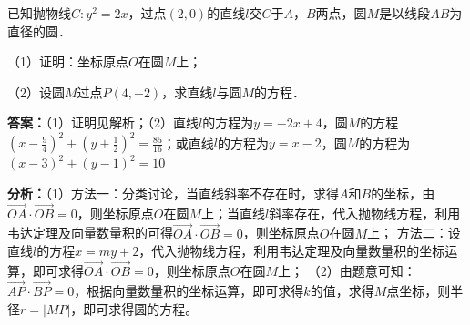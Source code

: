 \begin{question}[points=12]
已知抛物线$C:y^2=2x$，过点$(2,0)$的直线$l$交$C$于$A$，$B$两点，圆$M$是以线段$AB$为直径的圆．

（1）证明：坐标原点$O$在圆$M$上；

（2）设圆$M$过点$P(4,-2)$，求直线$l$与圆$M$的方程．
\begin{solution}
\textbf{答案：}（1）证明见解析；（2）直线$l$的方程为$y=-2x+4$，圆$M$的方程$(x-\frac{9}{4})^2+(y+\frac{1}{2})^2=\frac{85}{16}$；或直线$l$的方程为$y=x-2$，圆$M$的方程为$(x-3)^2+(y-1)^2=10$

\textbf{分析：}（1）方法一：分类讨论，当直线斜率不存在时，求得$A$和$B$的坐标，由$\overrightarrow{OA}\cdot\overrightarrow{OB}=0$，则坐标原点$O$在圆$M$上；当直线$l$斜率存在，代入抛物线方程，利用韦达定理及向量数量积的可得$\overrightarrow{OA}\cdot\overrightarrow{OB}=0$，则坐标原点$O$在圆$M$上；
方法二：设直线$l$的方程$x=my+2$，代入抛物线方程，利用韦达定理及向量数量积的坐标运算，即可求得$\overrightarrow{OA}\cdot\overrightarrow{OB}=0$，则坐标原点$O$在圆$M$上；
（2）由题意可知：$\overrightarrow{AP}\cdot\overrightarrow{BP}=0$，根据向量数量积的坐标运算，即可求得$k$的值，求得$M$点坐标，则半径$r=|MP|$，即可求得圆的方程。


\end{solution}
\end{question}
